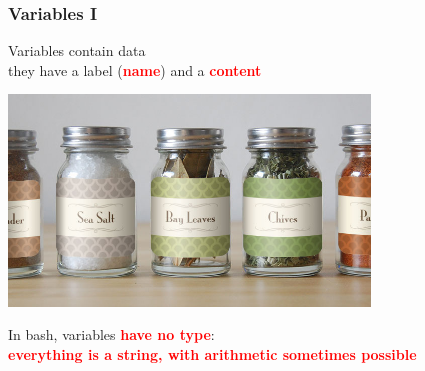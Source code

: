 \documentclass[unknownkeysallowed, 10pt, a4 paper, handout]{beamer}
\newcommand{\focus}[1]{\textbf{\textcolor{red}{#1}}}
\begin{document}
\begin{frame}
  \begin{center}
    \frametitle{Variables I}

    Variables contain data\\
    they have a label (\focus{name}) and a \focus{content}

    \begin{center}
      \includegraphics[width=0.72\textwidth]{pics/jars.jpg}
    \end{center}

    In bash, variables \focus{have no type}:\\
    \focus{everything is a string, with arithmetic sometimes possible}
  \end{center}
\end{frame}
\end{document}

